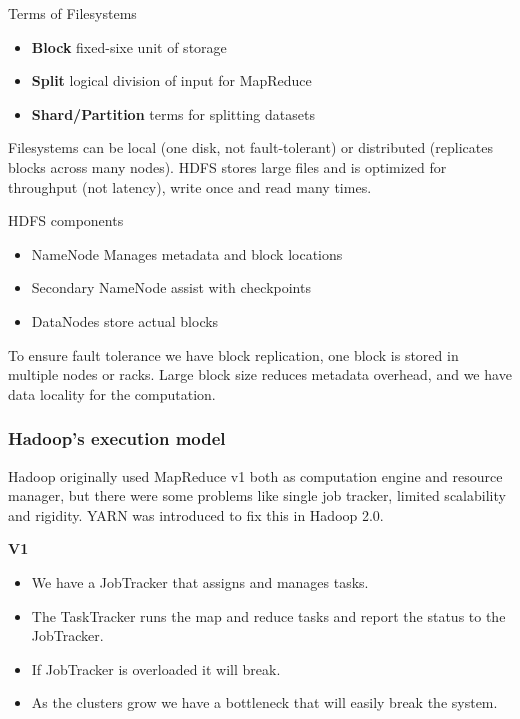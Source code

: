Terms of Filesystems

\begin{itemize}
    \item \textbf{Block} \ra fixed-sixe unit of storage
    \item \textbf{Split} \ra logical division of input for MapReduce
    \item \textbf{Shard/Partition} terms for splitting datasets
\end{itemize}

Filesystems can be local (one disk, not fault-tolerant) or distributed (replicates blocks across many nodes). HDFS stores large files and is optimized for throughput (not latency), write once and read many times.


\vspace{10pt}

HDFS components
\begin{itemize}
    \item NameNode \ra Manages metadata and block locations
    \item Secondary NameNode \ra assist with checkpoints
    \item DataNodes \ra store actual blocks
\end{itemize}

To ensure fault tolerance we have block replication, one block is stored in multiple nodes or racks. Large block size reduces metadata overhead, and we have data locality for the computation. 

\subsubsection{Hadoop's execution model}

Hadoop originally used MapReduce v1 both as computation engine and resource manager, but there were some problems like single job tracker, limited scalability and rigidity. YARN was introduced to fix this in Hadoop 2.0.

\textbf{V1}

\begin{itemize}
    \item We have a JobTracker that assigns and manages tasks.
    \item The TaskTracker runs the map and reduce tasks and report the status to the JobTracker. 
    \item If JobTracker is overloaded it will break.
    \item As the clusters grow we have a bottleneck that will easily break the system.
\end{itemize}

